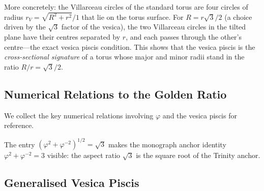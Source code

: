 More concretely: the Villarceau circles of the standard torus are four
circles of radius \(r_V = \sqrt{R^2 + r^2}/1\) that lie on the torus
surface.
For \(R = r\sqrt{3}/2\) (a choice driven by the \(\sqrt{3}\) factor of the
vesica), the two Villarceau circles in the tilted plane have their centres
separated by \(r\), and each passes through the other's centre—the
exact vesica piscis condition.
This shows that the vesica piscis is the \emph{cross-sectional signature}
of a torus whose major and minor radii stand in the ratio
\(R/r = \sqrt{3}/2\).

\subsection{Numerical Relations to the Golden Ratio}
\label{subsec:ch11-phi-numerical}

We collect the key numerical relations involving \(\varphi\) and
the vesica piscis for reference.

\begin{table}[H]
\centering
\caption{Vesica piscis quantities in terms of \(\varphi\) and \(r\).}
\label{tab:vp-quantities}
\end{table}

The entry \((\varphi^2 + \varphi^{-2})^{1/2} = \sqrt{3}\) makes the
monograph anchor identity \(\varphi^2 + \varphi^{-2} = 3\) visible:
the aspect ratio \(\sqrt{3}\) is the square root of the Trinity anchor.

\subsection{Generalised Vesica Piscis}
\label{subsec:ch11-generalised}

